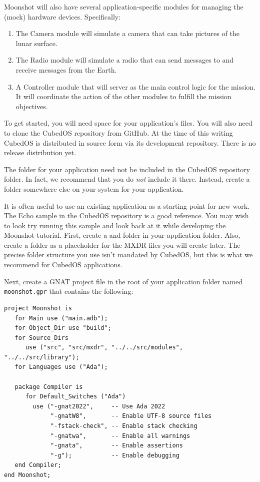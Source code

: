 Moonshot will also have several application-specific modules for managing the (mock) hardware
devices. Specifically:
\begin{enumerate}
  \item The Camera module will simulate a camera that can take pictures of the lunar surface.

  \item The Radio module will simulate a radio that can send messages to and receive messages
  from the Earth.


  \item A Controller module that will server as the main control logic for the mission. It will
  coordinate the action of the other modules to fulfill the mission objectives.
\end{enumerate}

To get started, you will need space for your application's files. You will also need to clone
the CubedOS repository from GitHub. At the time of this writing CubedOS is distributed in source
form via its development repository. There is no release distribution yet.

The folder for your application need not be included in the CubedOS repository folder. In fact,
we recommend that you do \emph{not} include it there. Instead, create a folder somewhere else on
your system for your application.

It is often useful to use an existing application as a starting point for new work. The Echo
sample in the CubedOS repository is a good reference. You may wish to look try running this sample 
and look back at it while developing the Moonshot tutorial. First, create a  and
 folder in your application folder. Also, create a folder  as a
placeholder for the MXDR files you will create later. The precise folder structure you use isn't
mandated by CubedOS, but this is what we recommend for CubedOS applications.

Next, create a GNAT project file in the root of your application folder named
\texttt{moonshot.gpr} that contains the following:
\begin{verbatim}
project Moonshot is
   for Main use ("main.adb");
   for Object_Dir use "build";
   for Source_Dirs
      use ("src", "src/mxdr", "../../src/modules", "../../src/library");
   for Languages use ("Ada");

   package Compiler is
      for Default_Switches ("Ada")
        use ("-gnat2022",     -- Use Ada 2022
             "-gnatW8",       -- Enable UTF-8 source files
             "-fstack-check", -- Enable stack checking
             "-gnatwa",       -- Enable all warnings
             "-gnata",        -- Enable assertions
             "-g");           -- Enable debugging
   end Compiler;
end Moonshot;
\end{verbatim}

